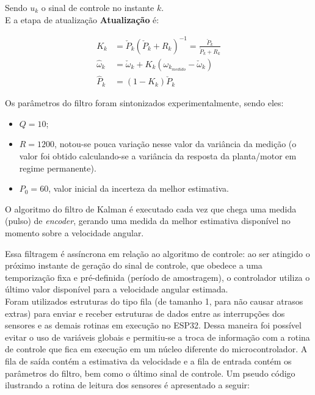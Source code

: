 Sendo $u_k$ o sinal de controle no instante $k$.\\

E a etapa de atualização \textbf{Atualização} é:

\begin{align*}
K_k &= \check{P}_k \left( \check{P}_k + R_k \right)^{-1} = \frac{\check{P}_k}{\check{P}_k + R_k}\\
\hat{\omega}_k &= \check{\omega}_k + K_k \left( \omega_{k_{medido}} - \check{\omega}_k \right)\\
\hat{P}_k &= \left( 1 - K_k \right) \check{P}_k
\end{align*}

Os parâmetros do filtro foram sintonizados experimentalmente, sendo eles:

\begin{itemize}
    \item $Q = 10$;
    \item $R = 1200$, notou-se pouca variação nesse valor da variância da medição (o valor foi obtido calculando-se a variância da resposta da planta/motor em regime permanente).
    \item $P_0 = 60$, valor inicial da incerteza da melhor estimativa.
\end{itemize}

O algoritmo do filtro de Kalman é executado cada vez que chega uma medida (pulso) de \emph{encoder}, gerando uma medida da melhor estimativa disponível no momento sobre a velocidade angular.

Essa filtragem é assíncrona em relação ao algoritmo de controle: ao ser atingido o próximo instante de geração do sinal de controle, que obedece a uma temporização fixa e pré-definida (período de amostragem), o controlador utiliza o último valor disponível para a velocidade angular estimada.\\

Foram utilizados estruturas do tipo fila (de tamanho 1, para não causar atrasos extras) para enviar e receber estruturas de dados entre as interrupções dos sensores e as demais rotinas em execução no ESP32. Dessa maneira foi possível evitar o uso de variáveis globais e permitiu-se a troca de informação com a rotina de controle que fica em execução em um núcleo diferente do microcontrolador. A fila de saída contém a estimativa da velocidade e a fila de entrada contém os parâmetros do filtro, bem como o último sinal de controle. Um pseudo código ilustrando a rotina de leitura dos sensores é apresentado a seguir:


